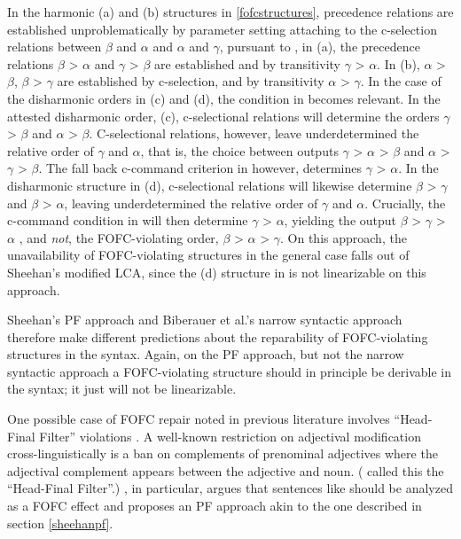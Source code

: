\documentclass[output=paper]{langscibook}
\begin{document}
In the harmonic (a) and (b) structures in \protect\ref{fofcstructures}, precedence relations are established unproblematically by parameter setting attaching to the c-selection relations between $\beta$ and $\alpha$ and $\alpha$ and $\gamma$, pursuant to \Last[i], in (a), the precedence relations {$\beta$ > $\alpha$ and  $\gamma$ > $\beta$} are established and by transitivity $\gamma$ > $\alpha$. In (b), {$\alpha$ > $\beta$, $\beta$ > $\gamma$} are established by c-selection, and by transitivity $\alpha$ > $\gamma$. In the case of the disharmonic orders in (c) and (d), the condition in \Last[ii] becomes relevant.  In the attested disharmonic order, (c), c-selectional relations will determine the orders $\gamma$ > $\beta$ and $\alpha$ > $\beta$.  C-selectional relations, however, leave underdetermined the relative order of $\gamma$ and $\alpha$, that is, the choice between outputs $\gamma$ > $\alpha$ > $\beta$ and $\alpha$ > $\gamma$ > $\beta$.  The fall back c-command criterion in \Last[ii] however, determines $\gamma$ > $\alpha$. In the disharmonic structure in (d), c-selectional relations will likewise determine $\beta$ > $\gamma$ and $\beta$ > $\alpha$, leaving underdetermined the relative order of $\gamma$ and $\alpha$.  Crucially, the c-command condition in  \Last[ii] will then determine $\gamma$ > $\alpha$, yielding the output $\beta$ > $\gamma$ > $\alpha$ , and \textit{not}, the FOFC-violating order, $\beta$ > $\alpha$ > $\gamma$.  On this approach, the unavailability of FOFC-violating structures in the general case falls out of Sheehan's modified LCA, since the (d) structure in \Last is not linearizable on this approach.\protect\footnotemark\protect{}
	
Sheehan's PF approach and Biberauer et al.'s narrow syntactic approach therefore make different predictions about the reparability of FOFC-violating structures in the syntax.  Again, on the PF approach, but not the narrow syntactic approach a FOFC-violating structure should in principle be derivable in the syntax; it just will not be linearizable.  

One possible case of FOFC repair noted in previous literature involves ``Head-Final Filter'' violations \citep{greenberg1963, williams1982,sheehan2017}.  A well-known restriction on adjectival modification cross-linguistically is a ban on complements of prenominal adjectives where the adjectival complement appears between the adjective and noun. (\cite{williams1982} called this the ``Head-Final Filter''.)  \cite{sheehan2017}, in particular, argues that sentences like \Next[c] should be analyzed as a FOFC effect and proposes an PF approach akin to the one described in section \protect\ref{sheehanpf}.
\end{document}
